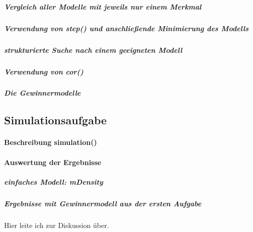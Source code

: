 \subparagraph{Vergleich aller Modelle mit jeweils nur einem Merkmal}
\subparagraph{Verwendung von step() und anschließende Minimierung des Modells}
\subparagraph{strukturierte Suche nach einem geeigneten Modell}
\subparagraph{Verwendung von cor()}
\subparagraph{Die Gewinnermodelle}

\newpage 
\subsection{Simulationsaufgabe}
\paragraph{Beschreibung simulation()}
\paragraph{Auswertung der Ergebnisse}
\subparagraph{einfaches Modell: \textit{mDensity}}
\subparagraph{Ergebnisse mit Gewinnermodell aus der ersten Aufgabe}
Hier leite ich zur Diskussion \"uber.